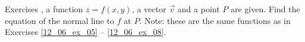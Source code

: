{\noindent Exercises}
{, a function $z=f(x,y)$, a vector $\vec v$ and a point $P$ are given. Find the equation of the normal line to $f$ at $P$. Note: these are the same functions as in  Exercises \ref{12_06_ex_05} -- \ref{12_06_ex_08}.
}
